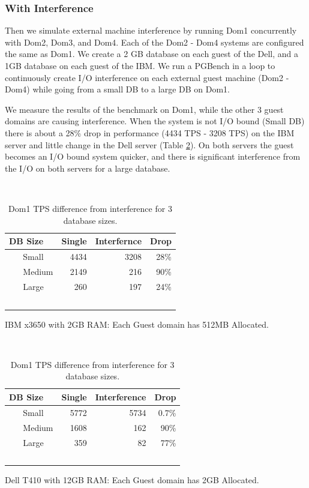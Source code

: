 \subsubsection{With Interference}
Then we simulate external machine interference by running Dom1 concurrently with Dom2, Dom3, and Dom4. 
Each of the Dom2 - Dom4 systems are configured the same as Dom1.  
We create a 2 GB database on each guest of the Dell, and a 1GB database on each guest of the IBM.  
We run a PGBench in a loop to continuously create I/O interference on each external guest machine (Dom2 - Dom4) while going from a small DB to a large DB on Dom1.

We measure the results of the benchmark on Dom1, while the other 3 guest domains are causing interference.  
When the system is not I/O bound (Small DB) there is about a 28\% drop in performance (4434 TPS - 3208 TPS) on the IBM server and little change in the Dell server (Table \ref{fig:tps1}).  
On both servers the guest becomes an I/O bound system quicker,  and there is significant interference from the I/O on both servers for a large database.

\begin{table}[h]
\begin{subtable}[h]{0.45\textwidth}
  \begin{tabular}{ l | r | r | r }
    DB Size & Single & Interfernce & Drop \\
    \hline
    Small & 4434 & 3208 & 28\% \\ \hline
    Medium & 2149 & 216 & 90\% \\ \hline
    Large & 260 & 197 & 24\% \\  \hline
    \hline
  \end{tabular}
\caption{IBM x3650 with 2GB RAM:  Each Guest domain has 512MB Allocated.}
\end{subtable}
\hfill
\begin{subtable}[h]{0.45\textwidth}
  \begin{tabular}{ l | r | r | r }
    DB Size & Single & Interference & Drop \\
    \hline
    Small & 5772 & 5734 & 0.7\% \\ \hline
    Medium & 1608 & 162 & 90\% \\ \hline
    Large & 359 & 82 & 77\% \\  \hline
    \hline
  \end{tabular}
\caption{Dell T410 with 12GB RAM:  Each Guest domain has 2GB Allocated. }
\end{subtable}
\caption{Dom1 TPS difference from interference for 3 database sizes.}
\label{fig:tps1}
\end{table}

